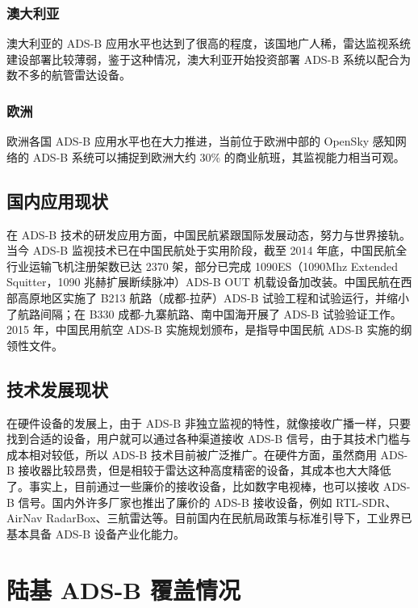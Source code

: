 \subsubsection{澳大利亚}

澳大利亚的 ADS-B 应用水平也达到了很高的程度，该国地广人稀，雷达监视系统建设部署比较薄弱，鉴于这种情况，澳大利亚开始投资部署 ADS-B 系统以配合为数不多的航管雷达设备。

\subsubsection{欧洲}

欧洲各国 ADS-B 应用水平也在大力推进，当前位于欧洲中部的 OpenSky 感知网络的 ADS-B 系统可以捕捉到欧洲大约 30\% 的商业航班，其监视能力相当可观。

\subsection{国内应用现状}

在 ADS-B 技术的研发应用方面，中国民航紧跟国际发展动态，努力与世界接轨。当今 ADS-B 监视技术已在中国民航处于实用阶段，截至 2014 年底，中国民航全行业运输飞机注册架数已达 2370 架，部分已完成 1090ES（1090Mhz Extended Squitter，1090 兆赫扩展断续脉冲）ADS-B OUT 机载设备加改装。中国民航在西部高原地区实施了 B213 航路（成都-拉萨）ADS-B 试验工程和试验运行，并缩小了航路间隔；在 B330 成都-九寨航路、南中国海开展了 ADS-B 试验验证工作。2015 年，中国民用航空 ADS-B 实施规划颁布，是指导中国民航 ADS-B 实施的纲领性文件。

\subsection{技术发展现状}

在硬件设备的发展上，由于 ADS-B 非独立监视的特性，就像接收广播一样，只要找到合适的设备，用户就可以通过各种渠道接收 ADS-B 信号，由于其技术门槛与
成本相对较低，所以 ADS-B 技术目前被广泛推广。在硬件方面，虽然商用 ADS-B 接收器比较昂贵，但是相较于雷达这种高度精密的设备，其成本也大大降低了。事实上，目前通过一些廉价的接收设备，比如数字电视棒，也可以接收 ADS-B 信号。国内外许多厂家也推出了廉价的 ADS-B 接收设备，例如 RTL-SDR、AirNav RadarBox、三航雷达等。目前国内在民航局政策与标准引导下，工业界已基本具备 ADS-B 设备产业化能力。

\section{陆基 ADS-B 覆盖情况}


